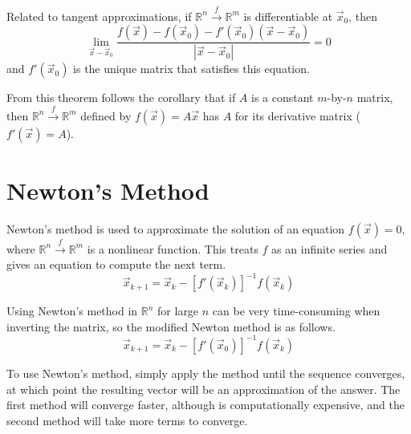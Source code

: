 \documentclass[11pt]{article}
\begin{document}
		Related to tangent approximations, if $\mathbb{R}^n \xrightarrow{f} \mathbb{R}^m$ is differentiable at $\vec{x}_0$, then 
		\begin{equation}
			\lim_{\vec{x} - \vec{x}_0} \frac{f(\vec{x}) - f(\vec{x}_0) - f'(\vec{x}_0)(\vec{x} - \vec{x}_0)}{|\vec{x} - \vec{x}_0|} = 0
		\end{equation}
		and $f'(\vec{x}_0)$ is the unique matrix that satisfies this equation. 
		
		From this theorem follows the corollary that if $A$ is a constant $m$-by-$n$ matrix, then $\mathbb{R}^n \xrightarrow{f} \mathbb{R}^m$ defined by $f(\vec{x}) = A\vec{x}$ has $A$ for its derivative matrix ($f'(\vec{x}) = A$).
		
\section{Newton's Method}
	Newton's method is used to approximate the solution of an equation $f(\vec{x}) = 0$, where $\mathbb{R}^n \xrightarrow{f} \mathbb{R}^m$ is a nonlinear function. This treats $f$ as an infinite series and gives an equation to compute the next term.
	\begin{equation}
		\vec{x}_{k+1} = \vec{x}_k - [f'(\vec{x}_k)]^{-1} f(\vec{x}_k)
	\end{equation}
	
	Using Newton's method in $\mathbb{R}^n$ for large $n$ can be very time-consuming when inverting the matrix, so the modified Newton method is as follows.
	\begin{equation}
		\vec{x}_{k+1} = \vec{x}_k - [f'(\vec{x}_0)]^{-1} f(\vec{x}_k)
	\end{equation}
	
	To use Newton's method, simply apply the method until the sequence converges, at which point the resulting vector will be an approximation of the answer. The first method will converge faster, although is computationally expensive, and the second method will take more terms to converge.
%		
%		


\end{document}
